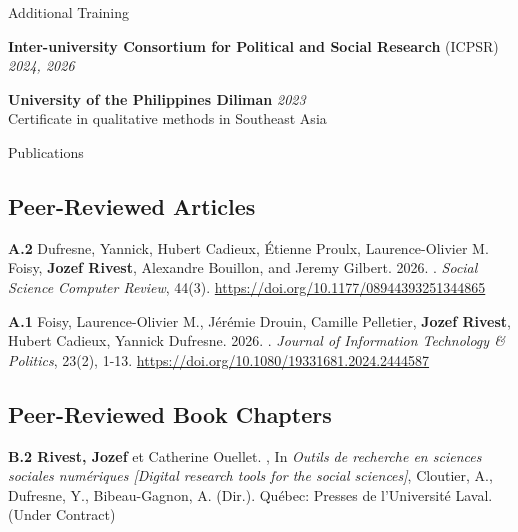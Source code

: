 \documentclass{resume} %
\begin{document}
\begin{rSection}{Additional Training}

	{\bf Inter-university Consortium for Political and Social Research} (ICPSR) \hfill {\em 2024, 2026}

	{\bf University of the Philippines Diliman} \hfill {\em 2023}
	\\ Certificate in qualitative methods in Southeast Asia\hfill
\end{rSection}

\begin{rSection}{Publications}

	\subsection*{Peer-Reviewed Articles}

	{\textbf{A.2} Dufresne, Yannick, Hubert Cadieux, Étienne Proulx,
		Laurence-Olivier M. Foisy, \textbf{Jozef Rivest}, Alexandre
		Bouillon, and Jeremy Gilbert. 2026. . \textit{Social
			Science Computer Review}, 44(3).
		\url{https://doi.org/10.1177/08944393251344865}}

	{\textbf{A.1} Foisy, Laurence-Olivier M., Jérémie Drouin, Camille
		Pelletier, \textbf{Jozef Rivest}, Hubert Cadieux, Yannick Dufresne.
		2026. . \textit{Journal of Information
			Technology \& Politics}, 23(2), 1-13.
		\url{https://doi.org/10.1080/19331681.2024.2444587}}

	\subsection*{Peer-Reviewed Book Chapters}

	{\textbf{B.2 Rivest, Jozef} et Catherine Ouellet. , In \textit{Outils
	de recherche en sciences sociales numériques [Digital
	research tools for the social sciences]}, Cloutier,
	A., Dufresne, Y., Bibeau-Gagnon, A. (Dir.). Québec:
	Presses de l'Université Laval. (Under Contract)} \par


\end{rSection}
\end{document}
